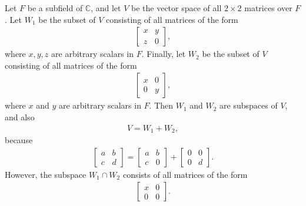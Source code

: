 \documentclass[12pt]{article}
\begin{document}
\begin{exm}
  Let $F$ be a subfield of $\mathbb{C}$, and let $V$ be the vector space of all $2
  \times 2$ matrices over $F$. Let $W_1$ be the subset of $V$ consisting of all
  matrices of the form
  \begin{align*}
    \begin{bmatrix}
      x & y\\
      z & 0
    \end{bmatrix},
  \end{align*}
  where $x,y,z$ are arbitrary scalars in $F$. Finally, let $W_2$ be the subset of $V$
  consisting of all matrices of the form
  \begin{align*}
    \begin{bmatrix}
      x & 0\\
      0 & y
    \end{bmatrix},
  \end{align*}
  where $x$ and $y$ are arbitrary scalars in $F$. Then $W_1$ and $W_2$ are subspaces
  of $V$, and also
  \begin{align*}
    V = W_1 + W_2,
  \end{align*}
  because
  \begin{align*}
    \begin{bmatrix}
      a & b\\
      c & d
    \end{bmatrix}
    =
    \begin{bmatrix}
      a & b\\
      c & 0
    \end{bmatrix}
    +
    \begin{bmatrix}
      0 & 0\\
      0 & d
    \end{bmatrix}.
  \end{align*}
  However, the subspace $W_1 \cap W_2$ consists of all matrices of the form
  \begin{align*}
    \begin{bmatrix}
      x & 0\\
      0 & 0
    \end{bmatrix}.
  \end{align*}
\end{exm}
\end{document}
